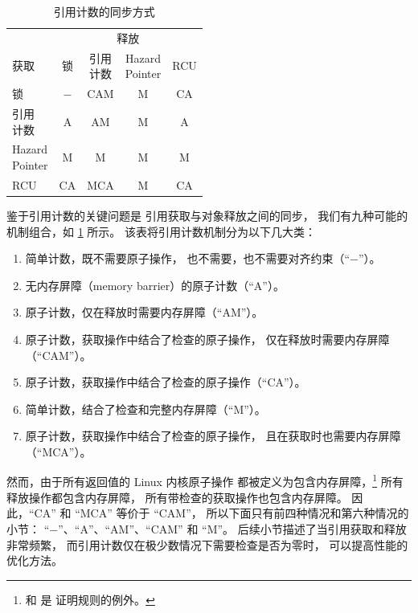 \begin{table}
\renewcommand*{\arraystretch}{1.25}
\small
\centering
\begin{tabular}{lcccc}
	\toprule
	& \multicolumn{4}{c}{释放} \\
	\cmidrule(l){2-5}
	获取	& 锁
				& \parbox[c]{.5in}{引用\\计数}
					& \parbox[c]{.5in}{Hazard\\Pointer}
						& RCU \\
	 \cmidrule(l){2-5}
	锁		& $-$	& CAM	& M	& CA  \\
	\parbox[c][6ex]{.6in}{引用\\计数}
			& A	& AM    & M	& A   \\
	\parbox[c][6ex]{.6in}{Hazard\\Pointer}
			& M	& M	& M	& M   \\
	RCU		& CA	& MCA	& M	& CA  \\
	\bottomrule
\end{tabular}
\caption{引用计数的同步方式}
\label{tab:together:Synchronizing Reference Counting}
\end{table}

鉴于引用计数的关键问题是
引用获取与对象释放之间的同步，
我们有九种可能的机制组合，如
\cref{tab:together:Synchronizing Reference Counting} 所示。
该表将引用计数机制分为以下几大类：
\begin{enumerate}
\item	简单计数，既不需要原子操作，
	也不需要，也不需要对齐约束（``$-$''）。
\item	无内存屏障（memory barrier）的原子计数（``A''）。
\item	原子计数，仅在释放时需要内存屏障（``AM''）。
\item	原子计数，获取操作中结合了检查的原子操作，
	仅在释放时需要内存屏障（``CAM''）。
\item	原子计数，获取操作中结合了检查的原子操作（``CA''）。
\item	简单计数，结合了检查和完整内存屏障（``M''）。
\item	原子计数，获取操作中结合了检查的原子操作，
	且在获取时也需要内存屏障（``MCA''）。
\end{enumerate}
然而，由于所有返回值的 Linux 内核原子操作
都被定义为包含内存屏障，\footnote{
	 和  是
	证明规则的例外。}
所有释放操作都包含内存屏障，
所有带检查的获取操作也包含内存屏障。
因此，``CA'' 和 ``MCA'' 等价于 ``CAM''，
所以下面只有前四种情况和第六种情况的小节：
``$-$''、``A''、``AM''、``CAM'' 和 ``M\@''。
后续小节描述了当引用获取和释放非常频繁，
而引用计数仅在极少数情况下需要检查是否为零时，
可以提高性能的优化方法。

